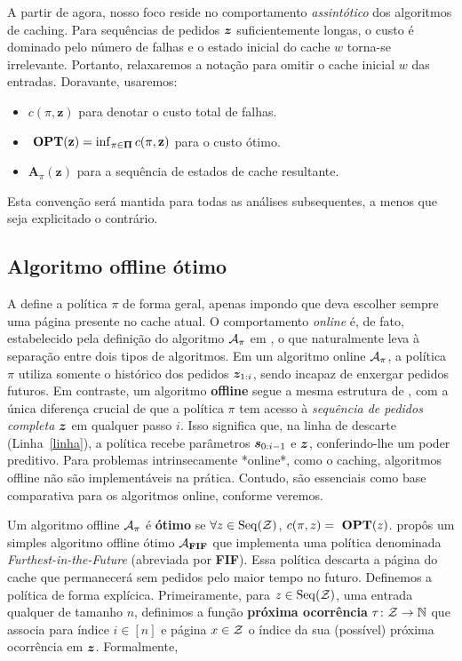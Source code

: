    A partir de agora, nosso foco reside no comportamento \emph{assintótico} dos algoritmos de caching. Para sequências de pedidos \(\bm{z}\) suficientemente longas, o custo é dominado pelo número de falhas e o estado inicial do cache \(w\) torna-se irrelevante.
Portanto, relaxaremos a notação para omitir o cache inicial \(w\) das entradas. Doravante, usaremos:
    \begin{itemize}
        \item \(c(\pi, \mathbf{z})\) para denotar o custo total de falhas.
        \item \(\ \textbf{OPT}(\mathbf{z}) = \inf_{\pi \in \mathbf{\Pi}} c(\pi, \mathbf{z})\) para o custo ótimo.
        \item \(\mathbf{A}_\pi(\mathbf{z})\) para a sequência de estados de cache resultante.
    \end{itemize}
Esta convenção será mantida para todas as análises subsequentes, a menos que seja explicitado o contrário.

\subsection{Algoritmo offline ótimo}

A  define a política \(\pi\) de forma geral, apenas impondo que deva escolher sempre uma página presente no cache atual. O comportamento \emph{online} é, de fato, estabelecido pela definição do algoritmo \(\mathcal{A}_\pi\) em , o que naturalmente leva à separação entre dois tipos de algoritmos. Em um algoritmo online \(\mathcal{A}_\pi\), a política \(\pi\) utiliza somente o histórico dos pedidos \(\bm{z}_{1:i}\), sendo incapaz de enxergar pedidos futuros. Em contraste, um algoritmo \textbf{offline} segue a mesma estrutura de , com a única diferença crucial de que a política \(\pi\) tem acesso à \emph{sequência de pedidos completa} \(\bm{z}\) em qualquer passo \(i\). Isso significa que, na linha de descarte (Linha~\ref{linha}), a política recebe parâmetros \(\bm{s}_{0:i-1}\) e \(\bm{z}\), conferindo-lhe um poder preditivo. Para problemas intrinsecamente *online*, como o caching, algoritmos offline não são implementáveis na prática. Contudo, são essenciais como base comparativa para os algoritmos online, conforme veremos.

Um algoritmo offline \(\mathcal{A}_\pi\) é \textbf{ótimo} se \(\forall z \in \operatorname{Seq}(\mathcal{Z})\), \(c(\pi, z) = \ \textbf{OPT}(z)\). \textcite{Belady66} propôs um simples algoritmo offline ótimo \(\mathcal{A}_{\bold{FIF}}\) que implementa uma política denominada \textit{Furthest-in-the-Future} (abreviada por \textbf{FIF}). Essa política descarta a página do cache que permanecerá sem pedidos pelo maior tempo no futuro. Definemos a política de forma explícica. Primeiramente, para \(z \in \operatorname{Seq}(\mathcal{Z})\), uma entrada qualquer de tamanho \(n\), definimos a função \textbf{próxima ocorrência} \(\tau \colon \mathcal{Z} \to \mathbb{N}\) que associa para índice \(i \in [n]\) e página \(x \in \mathcal{Z}\) o índice da sua (possível) próxima ocorrência em \(\bm{z}\). Formalmente,


